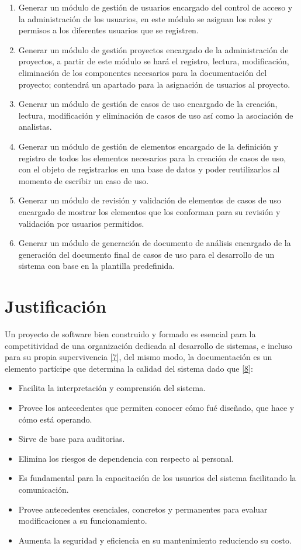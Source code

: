 \begin{enumerate}
	\item Generar un módulo de gestión de usuarios encargado del control de acceso y la administración de los usuarios, en este módulo se asignan los roles y permisos a los diferentes usuarios que se registren.
	\item Generar un módulo de gestión proyectos encargado de la administración de proyectos, a partir de este módulo se hará el registro, lectura, modificación, eliminación de los componentes necesarios para la documentación del proyecto; contendrá un apartado para la asignación de usuarios al proyecto.
	\item Generar un módulo de gestión de casos de uso encargado de la creación, lectura, modificación y eliminación de casos de uso así como la asociación de analistas.
	\item Generar un módulo de gestión de elementos encargado de la definición y registro de todos los elementos necesarios para la creación de casos de uso, con el objeto de registrarlos en una base de datos y poder reutilizarlos al momento de escribir un caso de uso.
	\item Generar un módulo de revisión y validación de elementos de casos de uso encargado de mostrar los elementos que los conforman para su revisión y validación por usuarios permitidos.
	\item Generar un módulo de generación de documento de análisis encargado de la generación del documento final de casos de uso para el desarrollo de un sistema con base en la plantilla predefinida.
\end{enumerate}
\newpage

\section{Justificación}
Un proyecto de software bien construido y formado es esencial para la competitividad de una organización dedicada al desarrollo de sistemas, e incluso para su propia supervivencia \hyperlink{b07}{[7]}, del mismo modo, la documentación es un elemento partícipe que determina la calidad del sistema dado que \hyperlink{b08}{[8]}:

\begin{itemize}
	\item Facilita la interpretación y comprensión del sistema.
	\item Provee los antecedentes que permiten conocer cómo fué diseñado, que hace y cómo está operando.
	\item Sirve de base para auditorias.
	\item Elimina los riesgos de dependencia con respecto al personal.
	\item Es fundamental para la capacitación de los usuarios del sistema facilitando la comunicación.
	\item Provee antecedentes esenciales, concretos y permanentes para evaluar modificaciones a su funcionamiento.
	\item Aumenta la seguridad y eficiencia en su mantenimiento reduciendo su costo.
\end{itemize}

